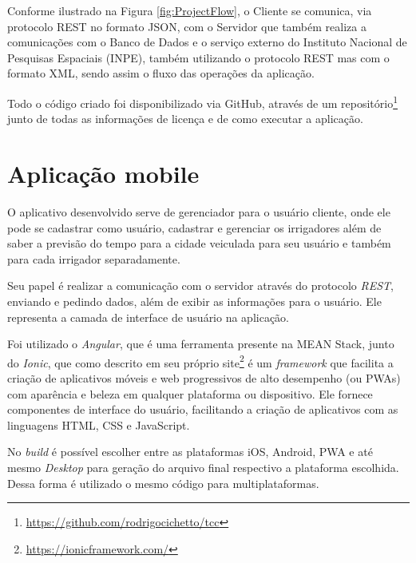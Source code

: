 \documentclass[
	12pt,				%
	openright,			%
	twoside,			%
	a4paper,			%
	english,			%
	brazil				%
	]{abntex2}
\begin{document}
Conforme ilustrado na Figura \ref{fig:ProjectFlow}, o Cliente se comunica, via protocolo REST no formato JSON, com o Servidor que também realiza a comunicações com o Banco de Dados e o serviço externo do Instituto Nacional de Pesquisas Espaciais (INPE), também utilizando o protocolo REST mas com o formato XML, sendo assim o fluxo das operações da aplicação.

Todo o código criado foi disponibilizado via GitHub, através de um repositório\footnote{\url{https://github.com/rodrigocichetto/tcc}} junto de todas as informações de licença e de como executar a aplicação.

\section{Aplicação mobile}

O aplicativo desenvolvido serve de gerenciador para o usuário cliente, onde ele pode se cadastrar como usuário, cadastrar e gerenciar os irrigadores além de saber a previsão do tempo para a cidade veiculada para seu usuário e também para cada irrigador separadamente.

Seu papel é realizar a comunicação com o servidor através do protocolo \textit{REST}, enviando e pedindo dados, além de exibir as informações para o usuário. Ele representa a camada de interface de usuário na aplicação.

Foi utilizado o \textit{Angular}, que é uma ferramenta presente na MEAN Stack, junto do \textit{Ionic}, que como descrito em seu próprio site\footnote{\url{https://ionicframework.com/}} é um \textit{framework} que facilita a criação de aplicativos móveis e web progressivos de alto desempenho (ou PWAs) com aparência e beleza em qualquer plataforma ou dispositivo. Ele fornece componentes de interface do usuário, facilitando a criação de aplicativos com as linguagens HTML, CSS e JavaScript.

No \textit{build} é possível escolher entre as plataformas iOS, Android, PWA e até mesmo \textit{Desktop} para geração do arquivo final respectivo a plataforma escolhida. Dessa forma é utilizado o mesmo código para multiplataformas.
\end{document}
